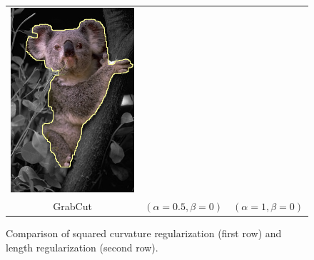 \documentclass[smallextended]{svjour3}       %
\begin{document}
{{\begin{figure}[ht!]
\begin{tabular}{ccc}
	\includegraphics[scale=0.25]{images/segmentation/bc/coala/r3/lg2_sq0_dt1_it50.png} \\

	GrabCut & $(\alpha=0.5, \beta=0)$ & $(\alpha=1, \beta=0)$
\end{tabular}	
\caption{Comparison of squared curvature regularization (first row) and length regularization (second row). }
\label{fig:parameters-influence}
\end{figure}

}}
\end{document}

